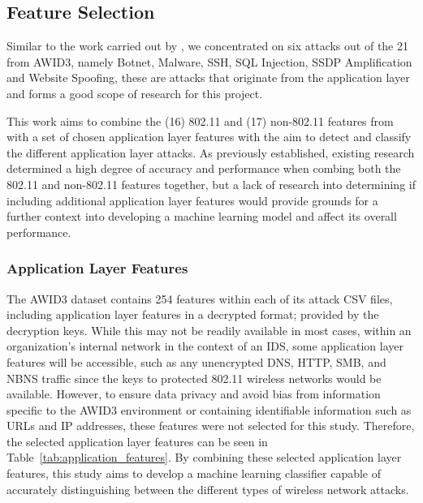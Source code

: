 

\subsection{Feature Selection}

Similar to the work carried out by \textcite{s22155633}, we concentrated on six attacks out of the 21 from AWID3, namely Botnet, Malware, SSH, SQL Injection, SSDP Amplification and Website Spoofing, these are attacks that originate from the application layer and forms a good scope of research for this project. 

This work aims to combine the (16) 802.11 and (17) non-802.11 features from \cite{s22155633} with a set of chosen application layer features with the aim to detect and classify the different application layer attacks. As previously established, existing research determined a high degree of accuracy and performance when combing both the 802.11 and non-802.11 features together, but a lack of research into determining if including additional application layer features would provide grounds for a further context into developing a machine learning model and affect its overall performance.

\subsubsection{Application Layer Features}

The AWID3 dataset contains 254 features within each of its attack CSV files, including application layer features in a decrypted format; provided by the decryption keys. While this may not be readily available in most cases, within an organization's internal network in the context of an IDS, some application layer features will be accessible, such as any unencrypted DNS, HTTP, SMB, and NBNS traffic since the keys to protected 802.11 wireless networks would be available. However, to ensure data privacy and avoid bias from information specific to the AWID3 environment or containing identifiable information such as URLs and IP addresses, these features were not selected for this study. Therefore, the selected application layer features can be seen in Table~\ref{tab:application_features}. By combining these selected application layer features, this study aims to develop a machine learning classifier capable of accurately distinguishing between the different types of wireless network attacks.


